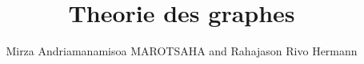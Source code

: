 \documentclass[12pt,a4paper,oneside]{report}
\author{Mirza Andriamanamisoa MAROTSAHA and Rahajason Rivo Hermann}
\title{Theorie des graphes }
\begin{document}
\maketitle
\renewcommand{\contentsname}{Sommaire}
\tableofcontents





\end{document}
